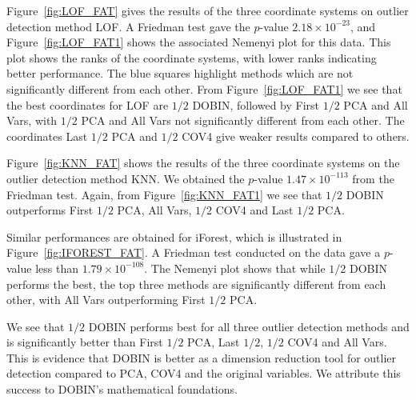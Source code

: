 \documentclass[letter,12pt]{article}
\begin{document}
Figure~\ref{fig:LOF_FAT} gives the results of the three coordinate systems on outlier detection method LOF. A Friedman test gave the $p$-value $ 2.18 \times 10^{-23}$, and Figure~\ref{fig:LOF_FAT1} shows the associated Nemenyi plot for this data. This plot shows the ranks of the coordinate systems, with lower ranks indicating better performance. The blue squares highlight methods which are not significantly different from each other. From Figure~\ref{fig:LOF_FAT1} we see that the best coordinates for LOF are $1/2$ DOBIN, followed by First $1/2$ PCA and All Vars, with $1/2$ PCA and All Vars not significantly different from each other. {\color{blue} The coordinates Last $1/2$ PCA and $1/2$ COV4 give weaker results compared to others.  }

Figure~\ref{fig:KNN_FAT} shows the results of the three coordinate systems on the outlier detection method KNN. We obtained the $p$-value $1.47\times 10^{-113}$ from the Friedman test. Again, from Figure~\ref{fig:KNN_FAT1} we see that $1/2$ DOBIN outperforms {\color{blue} First $1/2$ PCA,  All Vars, $1/2$ COV4 and Last $1/2$ PCA. }

Similar performances are obtained for iForest, which is illustrated in Figure~\ref{fig:IFOREST_FAT}. A Friedman test conducted on the data gave a $p$-value less than $1.79 \times 10^{-108}$. The Nemenyi plot shows that while $1/2$ DOBIN performs the best, {\color{blue} the top} three methods are significantly different from each other, with All Vars outperforming First $1/2$ PCA.  

We see that $1/2$ DOBIN performs best for all three outlier detection methods and is significantly better than {\color{blue} First $1/2$ PCA, Last $1/2$, $1/2$ COV4} and All Vars. This is evidence that DOBIN is better as a dimension reduction tool for outlier detection compared to PCA, {\color{blue} COV4} and the original variables. We attribute this success to DOBIN's  mathematical foundations.
\end{document}
